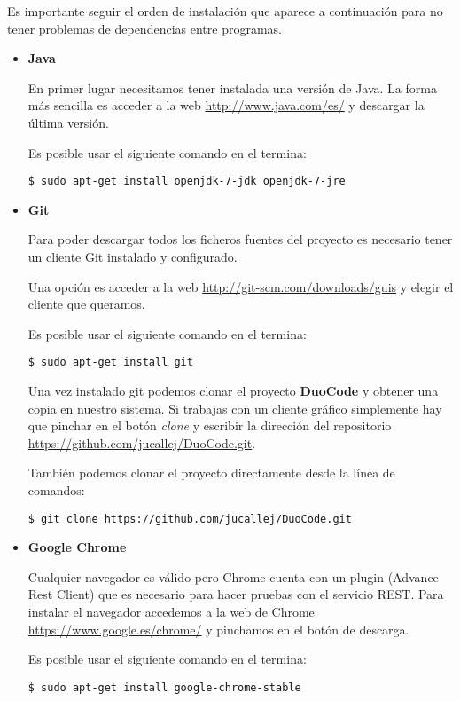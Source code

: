 Es importante seguir el orden de instalación que aparece a continuación para no tener problemas de dependencias entre programas. 

\begin{itemize}
\item \textbf{Java}

En primer lugar necesitamos tener instalada una versión de Java. La forma más sencilla es acceder a la web \url{http://www.java.com/es/} y descargar la última versión.

Es posible usar el siguiente comando en el termina:
{\codesize
\begin{verbatim}
$ sudo apt-get install openjdk-7-jdk openjdk-7-jre
\end{verbatim}
}


\item \textbf{Git}

Para poder descargar todos los ficheros fuentes del proyecto es necesario tener un cliente Git instalado y configurado.

Una opción es acceder a la web \url{http://git-scm.com/downloads/guis} y elegir el cliente que queramos. 

Es posible usar el siguiente comando en el termina:

{\codesize
\begin{verbatim}
$ sudo apt-get install git
\end{verbatim}
}

Una vez instalado git podemos clonar el proyecto \textbf{DuoCode} y obtener una copia en nuestro sistema. Si trabajas con un cliente gráfico simplemente hay que pinchar en el botón \textit{clone} y escribir la dirección del repositorio \url{https://github.com/jucallej/DuoCode.git}.

También podemos clonar el proyecto directamente desde la línea de comandos:
{\codesize
\begin{verbatim}
$ git clone https://github.com/jucallej/DuoCode.git
\end{verbatim}
}


\item \textbf{Google Chrome}

Cualquier navegador es válido pero Chrome cuenta con un plugin (Advance Rest Client) que es necesario para hacer pruebas con el servicio REST. Para instalar el navegador accedemos a la web de Chrome \url{https://www.google.es/chrome/} y pinchamos en el botón de descarga.

Es posible usar el siguiente comando en el termina:
{\codesize
\begin{verbatim}
$ sudo apt-get install google-chrome-stable
\end{verbatim}
}




\end{itemize}
